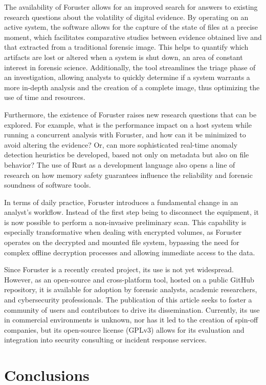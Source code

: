 \documentclass[preprint,12pt, a4paper]{elsarticle}
\begin{document}
The availability of Foruster allows for an improved search for answers to existing research questions about the volatility of digital evidence. By operating on an active system, the software allows for the capture of the state of files at a precise moment, which facilitates comparative studies between evidence obtained live and that extracted from a traditional forensic image. This helps to quantify which artifacts are lost or altered when a system is shut down, an area of constant interest in forensic science. Additionally, the tool streamlines the triage phase of an investigation, allowing analysts to quickly determine if a system warrants a more in-depth analysis and the creation of a complete image, thus optimizing the use of time and resources.

Furthermore, the existence of Foruster raises new research questions that can be explored. For example, what is the performance impact on a host system while running a concurrent analysis with Foruster, and how can it be minimized to avoid altering the evidence? Or, can more sophisticated real-time anomaly detection heuristics be developed, based not only on metadata but also on file behavior? The use of Rust as a development language also opens a line of research on how memory safety guarantees influence the reliability and forensic soundness of software tools.

In terms of daily practice, Foruster introduces a fundamental change in an analyst's workflow. Instead of the first step being to disconnect the equipment, it is now possible to perform a non-invasive preliminary scan. This capability is especially transformative when dealing with encrypted volumes, as Foruster operates on the decrypted and mounted file system, bypassing the need for complex offline decryption processes and allowing immediate access to the data.

Since Foruster is a recently created project, its use is not yet widespread. However, as an open-source and cross-platform tool, hosted on a public GitHub repository, it is available for adoption by forensic analysts, academic researchers, and cybersecurity professionals. The publication of this article seeks to foster a community of users and contributors to drive its dissemination. Currently, its use in commercial environments is unknown, nor has it led to the creation of spin-off companies, but its open-source license (GPLv3) allows for its evaluation and integration into security consulting or incident response services.

\section{Conclusions}
\end{document}

